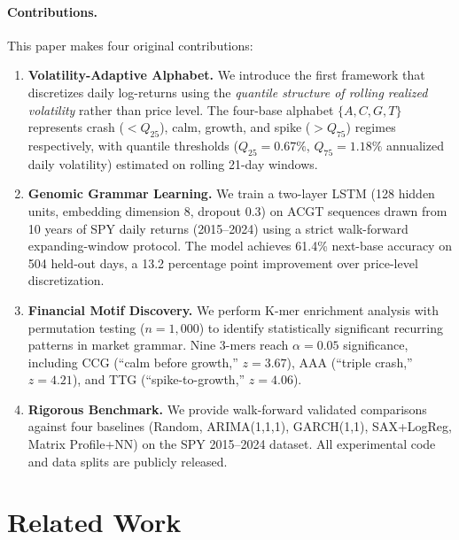 \documentclass[11pt]{article}
\begin{document}
\paragraph{Contributions.}
This paper makes four original contributions:

\begin{enumerate}
\item \textbf{Volatility-Adaptive Alphabet.}  We introduce the first
  framework that discretizes daily log-returns using the \emph{quantile
  structure of rolling realized volatility} rather than price level.
  The four-base alphabet $\{A, C, G, T\}$ represents crash ($< Q_{25}$),
  calm, growth, and spike ($> Q_{75}$) regimes respectively, with
  quantile thresholds ($Q_{25} = 0.67\%$, $Q_{75} = 1.18\%$ annualized
  daily volatility) estimated on rolling 21-day windows.

\item \textbf{Genomic Grammar Learning.}  We train a two-layer LSTM
  (128 hidden units, embedding dimension 8, dropout 0.3) on ACGT
  sequences drawn from 10 years of SPY daily returns (2015--2024)
  using a strict walk-forward expanding-window protocol.  The model
  achieves 61.4\% next-base accuracy on 504 held-out days, a 13.2
  percentage point improvement over price-level discretization.

\item \textbf{Financial Motif Discovery.}  We perform K-mer enrichment
  analysis with permutation testing ($n = 1{,}000$) to identify
  statistically significant recurring patterns in market grammar.
  Nine 3-mers reach $\alpha = 0.05$ significance, including CCG
  (``calm before growth,'' $z = 3.67$), AAA (``triple crash,''
  $z = 4.21$), and TTG (``spike-to-growth,'' $z = 4.06$).

\item \textbf{Rigorous Benchmark.}  We provide walk-forward validated
  comparisons against four baselines (Random, ARIMA(1,1,1),
  GARCH(1,1), SAX+LogReg, Matrix Profile+NN) on the SPY 2015--2024
  dataset.  All experimental code and data splits are publicly released.
\end{enumerate}

\section{Related Work}
\label{sec:related}
\end{document}
